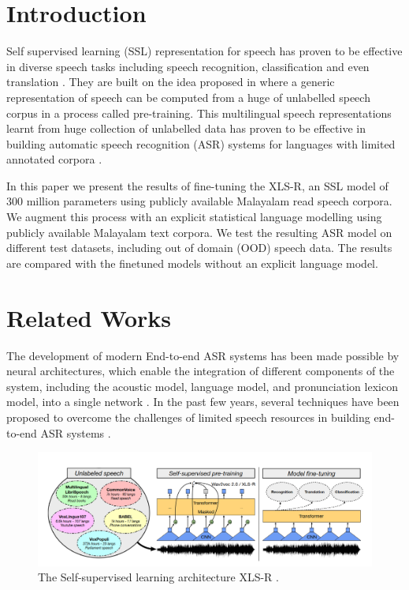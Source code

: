 \documentclass[runningheads]{llncs}
\begin{document}
\section{Introduction}

Self supervised learning (SSL)  representation for speech has proven to be effective in diverse speech tasks including speech recognition, classification and even translation \cite{baevski2020wav2vec,babu2021xls,barrault2023seamlessm4t}.  They are built on the idea proposed in \cite{schneider2019wav2vec} where a generic representation of speech can be computed from a huge of unlabelled speech corpus in a process called pre-training. This multilingual speech representations learnt from huge collection of unlabelled data has proven to be effective in building automatic speech recognition (ASR) systems for languages with limited annotated corpora \cite{conneau2020unsupervised}. 

In this paper we present the results of fine-tuning the XLS-R, an SSL model \cite{babu2021xls} of 300 million parameters using publicly available Malayalam read speech corpora. We augment this process with an explicit statistical language modelling using publicly available Malayalam text corpora. We test the resulting ASR model on different test datasets, including out of domain (OOD) speech data. The results are compared with the finetuned models without an explicit language model.

\section{Related Works}
\label{sec:relatedworks}

The development of modern End-to-end ASR systems has been made possible by neural architectures, which enable the integration of different components of the system, including the acoustic model, language model, and pronunciation lexicon model, into a single network \cite{georgescu2021performance}. 
In the past  few years, several  techniques have been proposed to overcome the challenges of limited speech resources in building end-to-end ASR systems \cite{barrault2023seamless,pratap2024scaling,whisper} .



\begin{figure}[htpb]
    \includegraphics[width=\textwidth]{XLS-R.png}
    \caption{The Self-supervised learning architecture XLS-R \cite{babu2021xls}.} \label{XLS-R}
\end{figure}
\end{document}
